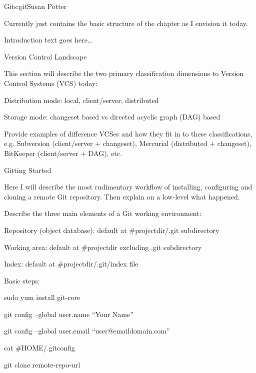 \begin{aosachapter}{Git}{s:git}{Susan Potter}

Currently just contains the basic structure of the chapter as I envision 
it today.

Introduction text goes here\ldots

\begin{aosasect1}{Version Control Landscape}

This section will describe the two primary classification dimensions to 
Version Control Systems (VCS) today:

\begin{aosaitemize}
  \item Distribution mode: local, client/server, distributed
  \item Storage mode: changeset based vs directed acyclic graph (DAG) based
\end{aosaitemize}

Provide examples of difference VCSes and how they fit in to these 
classifications, e.g. Subversion (client/server + changeset), Mercurial 
(distributed + changeset), BitKeeper (client/server + DAG), etc.

\end{aosasect1}

\begin{aosasect1}{Gitting Started}

Here I will describe the most rudimentary workflow of installing, configuring 
and cloning a remote Git repository. Then explain on a low-level what happened.

Describe the three main elements of a Git working environment:
\begin{aosaitemize}
  \item Repository (object database): default at #{projectdir}/.git subdirectory
  \item Working area: default at #{projectdir} excluding .git subdirectory
  \item Index: default at #{projectdir}/.git/index file
\end{aosaitemize}

Basic steps:
\begin{aosaitemize}
  \item sudo yum install git-core
  \item git config --global user.name ``Your Name''
  \item git config --global user.email ``user@emaildomain.com''
  \item cat #{HOME}/.gitconfig
  \item git clone remote-repo-url
\end{aosaitemize}


\end{aosasect1}
\end{aosachapter}
